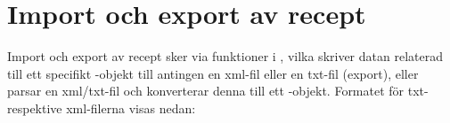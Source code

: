 \section{Import och export av recept}
Import och export av recept sker via funktioner i \Shell, vilka skriver datan relaterad till ett specifikt \Recipe-objekt till antingen en xml-fil eller en txt-fil (export),
 eller parsar en xml/txt-fil och konverterar denna till ett \Recipe-objekt. Formatet för txt- respektive xml-filerna visas nedan:

\begin{framed}

\end{framed}

\begin{framed}

\end{framed}

\begin{framed}

\end{framed}
